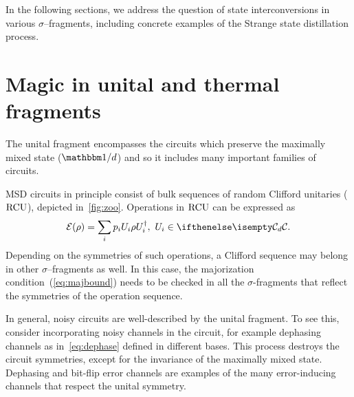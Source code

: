 \documentclass[pra,
aps,
twocolumn,
superscriptaddress,
groupedaddress,
nofootinbib,
reprint
]{revtex4-1}
\begin{document}
In the following sections, we address the question of state interconversions in various $\sigma$--fragments, including concrete examples of the Strange state distillation process. 

\section{Magic in unital and thermal fragments}\label{sec:unital}
The unital fragment encompasses the circuits which preserve the maximally mixed state ($\id/d$) and so it includes many important families of circuits.

MSD circuits in principle consist of bulk sequences of random Clifford unitaries (${\rm{RCU}}$), depicted in~\cref{fig:zoo}.
Operations in ${\rm{RCU}}$ can be expressed as
\begin{equation}
    \E(\rho) = \sum_i p_i U_i \rho U_i^\dagger,\ U_i \in \cd.
\end{equation}
Depending on the symmetries of such operations, a Clifford sequence may belong in other $\sigma$--fragments as well.
In this case, the majorization condition~(\ref{eq:majbound}) needs to be checked in all the $\sigma$-fragments that reflect the symmetries of the operation sequence.

In general, noisy circuits are well-described by the unital fragment.
To see this, consider incorporating noisy channels in the circuit, for example dephasing channels as in~\cref{eq:dephase} defined in different bases.
This process destroys the circuit symmetries, except for the invariance of the maximally mixed state.
Dephasing and bit-flip error channels are examples of the many error-inducing channels that respect the unital symmetry. 
\end{document}
